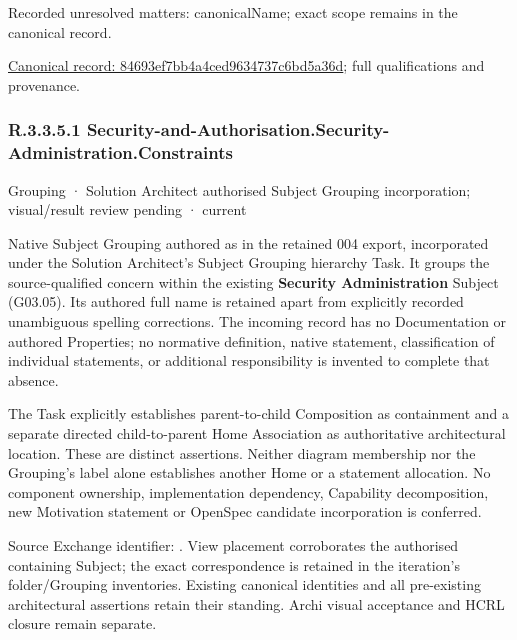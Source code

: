 {\small Recorded unresolved matters: canonicalName; exact scope remains in the canonical record.}\par
{\footnotesize \href{../../../../continuum/grouping/84693ef7bb4a4ced9634737c6bd5a36d.md}{Canonical record: 84693ef7bb4a4ced9634737c6bd5a36d}; full qualifications and provenance.}\par
\subsubsection*{R.3.3.5.1 Security-and-Authorisation.Security-Administration.Constraints}
\label{navigation:R.3.3.5.1}

\label{element:f9035f49dbab4676b23ab9e4f45678f9}
{\small Grouping · Solution Architect authorised Subject Grouping incorporation; visual/result review pending · current}\par

Native Subject Grouping authored as \texttt{} in the retained 004 export,
incorporated under the Solution Architect's Subject Grouping hierarchy Task.
It groups the source-qualified \texttt{} concern within
the existing \textbf{Security Administration} Subject (G03.05). Its authored full name
is retained apart from explicitly recorded unambiguous spelling corrections.
The incoming record has no Documentation or authored Properties; no normative
definition, native statement, classification of individual statements, or
additional responsibility is invented to complete that absence.



The Task explicitly establishes parent-to-child Composition as containment and
a separate directed child-to-parent Home Association as authoritative architectural
location. These are distinct assertions. Neither diagram membership nor the
Grouping's label alone establishes another Home or a statement allocation.
No component ownership, implementation dependency, Capability decomposition,
new Motivation statement or OpenSpec candidate incorporation is conferred.



Source Exchange identifier: \texttt{}. View placement corroborates
the authorised containing Subject; the exact correspondence is retained in the
iteration's folder/Grouping inventories. Existing canonical identities and all
pre-existing architectural assertions retain their standing. Archi visual
acceptance and HCRL closure remain separate.


